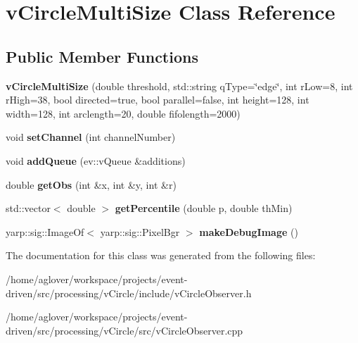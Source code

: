 \hypertarget{classvCircleMultiSize}{}\section{v\+Circle\+Multi\+Size Class Reference}
\label{classvCircleMultiSize}
\subsection*{Public Member Functions}
\begin{DoxyCompactItemize}
\item 
{\bfseries v\+Circle\+Multi\+Size} (double threshold, std\+::string q\+Type=\char`\"{}edge\char`\"{}, int r\+Low=8, int r\+High=38, bool directed=true, bool parallel=false, int height=128, int width=128, int arclength=20, double fifolength=2000)\hypertarget{classvCircleMultiSize_aa3e7373ef68728fab536417c491e35a4}{}\label{classvCircleMultiSize_aa3e7373ef68728fab536417c491e35a4}

\item 
void {\bfseries set\+Channel} (int channel\+Number)\hypertarget{classvCircleMultiSize_afe4c5983834ed7d5fa097fcc9677d234}{}\label{classvCircleMultiSize_afe4c5983834ed7d5fa097fcc9677d234}

\item 
void {\bfseries add\+Queue} (ev\+::v\+Queue \&additions)\hypertarget{classvCircleMultiSize_a101a1960c5012a83e03b9fdd8276f263}{}\label{classvCircleMultiSize_a101a1960c5012a83e03b9fdd8276f263}

\item 
double {\bfseries get\+Obs} (int \&x, int \&y, int \&r)\hypertarget{classvCircleMultiSize_a661f425152259951f87167bdcd53caaf}{}\label{classvCircleMultiSize_a661f425152259951f87167bdcd53caaf}

\item 
std\+::vector$<$ double $>$ {\bfseries get\+Percentile} (double p, double th\+Min)\hypertarget{classvCircleMultiSize_a92b94e14acce928e07922809a45cd5c0}{}\label{classvCircleMultiSize_a92b94e14acce928e07922809a45cd5c0}

\item 
yarp\+::sig\+::\+Image\+Of$<$ yarp\+::sig\+::\+Pixel\+Bgr $>$ {\bfseries make\+Debug\+Image} ()\hypertarget{classvCircleMultiSize_a1dc2c81da6abc8aaaaedf0d169ad9671}{}\label{classvCircleMultiSize_a1dc2c81da6abc8aaaaedf0d169ad9671}

\end{DoxyCompactItemize}


The documentation for this class was generated from the following files\+:\begin{DoxyCompactItemize}
\item 
/home/aglover/workspace/projects/event-\/driven/src/processing/v\+Circle/include/v\+Circle\+Observer.\+h\item 
/home/aglover/workspace/projects/event-\/driven/src/processing/v\+Circle/src/v\+Circle\+Observer.\+cpp\end{DoxyCompactItemize}
